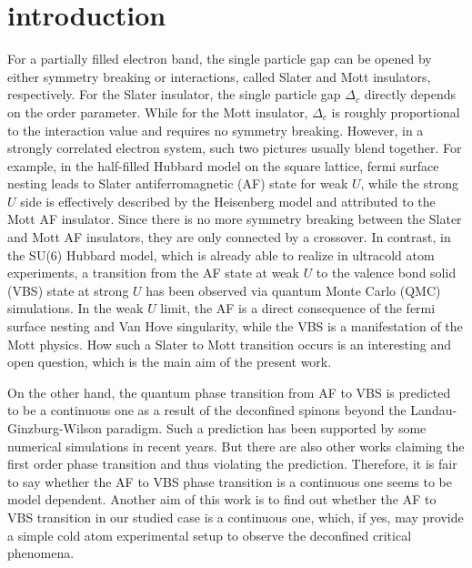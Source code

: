 \documentclass[twocolumn,superscriptaddress,prb]{revtex4-1}
\begin{document}
\section{introduction}
For a partially filled electron band, the single particle gap can be opened by either symmetry breaking or interactions, called Slater \cite{Slater_PR_1951} and Mott \cite{Mott_PPSA_1949} insulators, respectively. For the Slater insulator, the single particle gap $\Delta_c$ directly depends on the order parameter. While for the Mott insulator, $\Delta_c$ is roughly proportional to the interaction value and requires no symmetry breaking. However, in a strongly correlated electron system, such two pictures usually blend together. \cite{Imada_RMP_1998,Lee_RMP_2006} For example, in the half-filled Hubbard model on the square lattice, fermi surface nesting leads to Slater antiferromagnetic (AF) state for weak $U$, while the strong $U$ side is effectively described by the Heisenberg model and attributed to the Mott AF insulator. \cite{Hirsch_PRB_1985} Since there is no more symmetry breaking between the Slater and Mott AF insulators, they are only connected by a crossover. \cite{Pruschke_JPCM_2003} In contrast, in the SU(6) Hubbard model, which is already able to realize in ultracold atom experiments, \cite{Wu_PRL_2003,*Wu_MPLB_2006,Honerkamp_PRL_2004,DeSalvo_PRL_2010,*Taie_PRL_2010,Krauser_NP_2012,*Taie_NP_2012,*Zhang_S_2014,Cazalilla_RPP_2014,*Laflamme_AP_2016} a transition from the AF state at weak $U$ to the valence bond solid (VBS) state at strong $U$ has been observed via quantum Monte Carlo (QMC) simulations. \cite{Wang_PRL_2014} In the weak $U$ limit, the AF is a direct consequence of the fermi surface nesting and Van Hove singularity, while the VBS is a manifestation of the Mott physics. \cite{Zhou_PRB_2016} How such a Slater to Mott transition occurs is an interesting and open question, which is the main aim of the present work.

On the other hand, the quantum phase transition from AF to VBS is predicted to be a continuous one as a result of the deconfined spinons beyond the Landau-Ginzburg-Wilson paradigm. \cite{Senthil_S_2004,*Senthil_PRB_2004,*Levin_PRB_2004} Such a prediction has been supported by some numerical simulations in recent years. \cite{Sandvik_PRL_2007,*Melko_PRL_2008,*Sandvik_PRL_2010,*Kaul_PRL_2012,*Pujari_PRL_2013,*Shao_S_2016,*Nahum_PRX_2015,*Wang_PRB_2016,*Assaad_PRX_2016} But there are also other works claiming the first order phase transition and thus violating the prediction. \cite{Kragset_PRL_2006,*Kuklov_AP_2006,*Kuklov_PRL_2008,*Sen_PRB_2010,*Papanikolaou_PRL_2010,*Block_PRL_2013,*DEmidio_PRB_2016,*DEmidio_PRL_2017} Therefore, it is fair to say whether the AF to VBS phase transition is a continuous one seems to be model dependent. Another aim of this work is to find out whether the AF to VBS transition in our studied case is a continuous one, which, if yes, may provide a simple cold atom experimental setup to observe the deconfined critical phenomena. 
\end{document}
